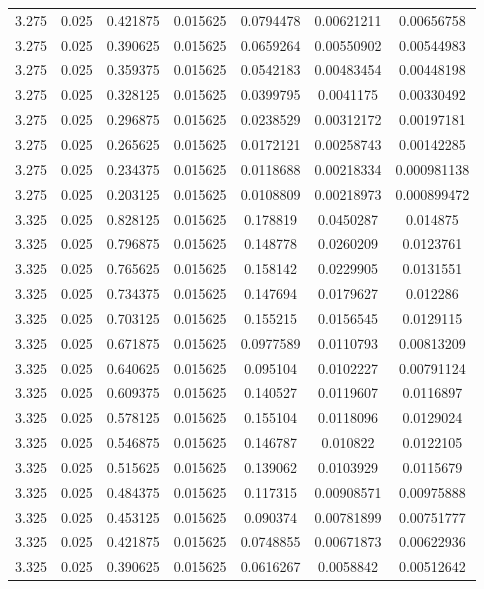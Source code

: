 \begin{flushleft}
\begin{longtable}{ccccccc}
3.275 & 0.025 & 0.421875 & 0.015625 & 0.0794478 & 0.00621211 & 0.00656758  \\ 
3.275 & 0.025 & 0.390625 & 0.015625 & 0.0659264 & 0.00550902 & 0.00544983  \\ 
3.275 & 0.025 & 0.359375 & 0.015625 & 0.0542183 & 0.00483454 & 0.00448198  \\ 
3.275 & 0.025 & 0.328125 & 0.015625 & 0.0399795 & 0.0041175 & 0.00330492  \\ 
3.275 & 0.025 & 0.296875 & 0.015625 & 0.0238529 & 0.00312172 & 0.00197181  \\ 
3.275 & 0.025 & 0.265625 & 0.015625 & 0.0172121 & 0.00258743 & 0.00142285  \\ 
3.275 & 0.025 & 0.234375 & 0.015625 & 0.0118688 & 0.00218334 & 0.000981138  \\ 
3.275 & 0.025 & 0.203125 & 0.015625 & 0.0108809 & 0.00218973 & 0.000899472  \\ 
3.325 & 0.025 & 0.828125 & 0.015625 & 0.178819 & 0.0450287 & 0.014875  \\ 
3.325 & 0.025 & 0.796875 & 0.015625 & 0.148778 & 0.0260209 & 0.0123761  \\ 
3.325 & 0.025 & 0.765625 & 0.015625 & 0.158142 & 0.0229905 & 0.0131551  \\ 
3.325 & 0.025 & 0.734375 & 0.015625 & 0.147694 & 0.0179627 & 0.012286  \\ 
3.325 & 0.025 & 0.703125 & 0.015625 & 0.155215 & 0.0156545 & 0.0129115  \\ 
3.325 & 0.025 & 0.671875 & 0.015625 & 0.0977589 & 0.0110793 & 0.00813209  \\ 
3.325 & 0.025 & 0.640625 & 0.015625 & 0.095104 & 0.0102227 & 0.00791124  \\ 
3.325 & 0.025 & 0.609375 & 0.015625 & 0.140527 & 0.0119607 & 0.0116897  \\ 
3.325 & 0.025 & 0.578125 & 0.015625 & 0.155104 & 0.0118096 & 0.0129024  \\ 
3.325 & 0.025 & 0.546875 & 0.015625 & 0.146787 & 0.010822 & 0.0122105  \\ 
3.325 & 0.025 & 0.515625 & 0.015625 & 0.139062 & 0.0103929 & 0.0115679  \\ 
3.325 & 0.025 & 0.484375 & 0.015625 & 0.117315 & 0.00908571 & 0.00975888  \\ 
3.325 & 0.025 & 0.453125 & 0.015625 & 0.090374 & 0.00781899 & 0.00751777  \\ 
3.325 & 0.025 & 0.421875 & 0.015625 & 0.0748855 & 0.00671873 & 0.00622936  \\ 
3.325 & 0.025 & 0.390625 & 0.015625 & 0.0616267 & 0.0058842 & 0.00512642  \\ 

\end{longtable}
\end{flushleft}
